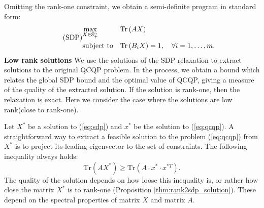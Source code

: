 Omitting the rank-one constraint, we obtain a semi-definite program in standard form:
%
\begin{equation}\label{eq:sdp}
\tag{SDP}
\begin{aligned}
& \underset{X \in \mathbb{S}_{+}^n}{\text{max}}
& &\mathrm{Tr}\left(A X\right) \\
& \text{subject to}
& &\mathrm{Tr}\left(B_i X\right) = 1,  \quad\forall i =1,\ldots,m.\\
\end{aligned}
\end{equation}
%
%
%
\noindent\textbf{Low rank solutions}
We use the solutions of the SDP relaxation to extract solutions to
the original QCQP problem. In the process, we obtain a bound which relates
the global SDP bound and the optimal value of QCQP, giving a measure of
the quality of the extracted solution. If the solution is
rank-one, then the relaxation is exact. Here we consider the case where the solutions are
 low rank(close to rank-one).

Let $X^*$ be a solution to (\ref{eq:sdp}) and $x^{*}$ be the solution
to (\ref{eq:qcqp}).
A straightforward way to extract a feasible solution to the problem
(\ref{eq:qcqp}) from $X^*$ is to project its leading eigenvector to
the set of constraints.  The following inequality always holds:
 $$\mathrm{Tr}\left(A X^{*}\right) \geq \mathrm{Tr}\left(A \cdot x^{*} \cdot x^{*T}\right).$$
The quality of the solution depends on how loose this inequality is,
or rather how close the matrix $X^*$ is to rank-one (Proposition \ref{thm:rank2sdp_solution}). These depend on the spectral properties of matrix
$X$ and matrix $A$.
%
%

